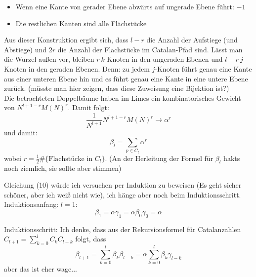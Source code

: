 \documentclass[a4paper, 11pt]{scrreprt}
\newenvironment{beweis}[1][Beweis]{\begin{trivlist}
	\item[\hskip \labelsep {\bfseries #1}]}
	{\end{trivlist}}
\begin{document}
\begin{beweis}
\begin{itemize}
	\item Wenn eine Kante von gerader Ebene abwärts auf ungerade Ebene führt: \(-1\)
	\item Die restlichen Kanten sind alle Flächstücke
\end{itemize}
Aus dieser Konstruktion ergibt sich, dass \(l-r\) die Anzahl der Aufstiege (und Abstiege) und \(2r\) die Anzahl der Flachstücke im Catalan-Pfad sind. Lässt man die Wurzel außen vor, bleiben \(r\ k\)-Knoten in den ungeraden Ebenen und \(l-r\ j\)-Knoten in den geraden Ebenen. Denn: zu jedem \(j\)-Knoten führt genau eine Kante aus einer unteren Ebene hin und es führt genau eine Kante in eine untere Ebene zurück. (müsste man hier zeigen, dass diese Zuweisung eine Bijektion ist?)\\
Die betrachteten Doppelbäume haben im Limes ein kombinatorisches Gewicht von \(N^{l+1-r}M(N)^r\). Damit folgt:
	\[\frac {1}{N^{l+1}} N^{l+1-r}M(N)^r \to \alpha^r\]
und damit:
	\[\beta_l=\sum_{p\in C_l} \alpha^r\]
wobei \(r = \frac 1 2 \#\{\text{Flachstücke in }C_l\}\). (An der Herleitung der Formel für \(\beta_l\) hakts noch ziemlich, sie sollte aber stimmen)

Gleichung (10) würde ich versuchen per Induktion zu beweisen (Es geht sicher schöner, aber ich weiß nicht wie), ich hänge aber noch beim Induktionsschritt.  \\
Induktionsanfang: \(l=1\): 
	\[\beta_1 = \alpha\gamma_1=\alpha\beta_0 \gamma_0=\alpha\]
	
Induktionsschritt: Ich denke, dass aus der Rekursionsformel für Catalanzahlen \(C_{l+1} = \sum_{k=0}^l C_kC_{l-k}\) folgt, dass
	\[\beta_{l+1} = \sum_{k=0}^l \beta_k\beta_{l-k} = \alpha \sum_{k=0}^l \beta_k\gamma_{l-k}\]
aber das ist eher wage...


\end{beweis}
\end{document}
